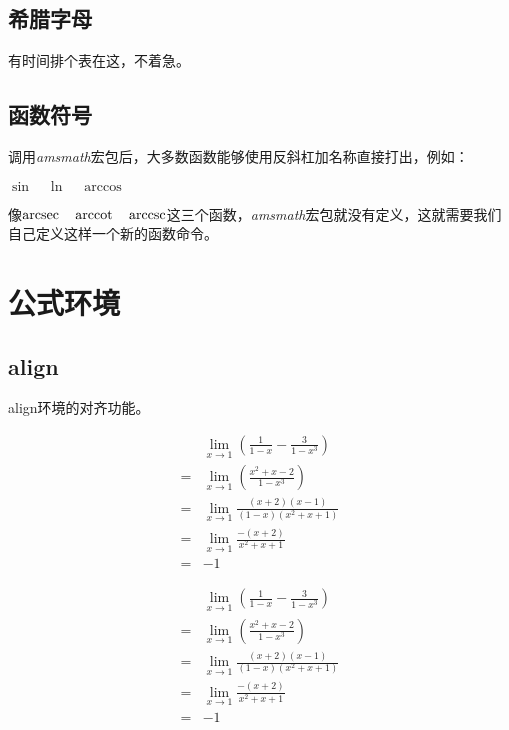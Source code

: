 \subsection{希腊字母}
有时间排个表在这，不着急。

\subsection{函数符号}
调用\emph{amsmath}宏包后，大多数函数能够使用反斜杠加名称直接打出，例如：

\begin{codeshow}
$ \sin \quad \ln \quad \arccos $
\end{codeshow}

像$ \arcsec \quad \arccot \quad \arccsc $这三个函数，\emph{amsmath}宏包就没有定义，这就需要我们自己定义这样一个新的函数命令。
\begin{latex}{}
\DeclareMathOperator{\arcsec}{arcsec}
\DeclareMathOperator{\arccot}{arccot}
\DeclareMathOperator{\arccsc}{arccsc}
\end{latex}

\section{公式环境}

\subsection{align}
align环境的对齐功能。
\begin{latex}{}
\begin{align*}
&\lim\limits_{x\to 1}\left(\frac{1}{1-x}-\frac{3}{1-x^3}\right)\\
= &\lim\limits_{x\to 1}\left(\frac{x^2+x-2}{1-x^3}\right)  \\
=& \lim\limits_{x\to 1}\frac{(x+2)(x-1)}{(1-x)(x^2+x+1)}\\
=& \lim\limits_{x\to 1}\frac{-(x+2)}{x^2+x+1}\\
=& -1
\end{align*}
\end{latex}

\begin{align*}
&\lim\limits_{x\to 1}\left(\frac{1}{1-x}-\frac{3}{1-x^3}\right)\\
= &\lim\limits_{x\to 1}\left(\frac{x^2+x-2}{1-x^3}\right)  \\
=& \lim\limits_{x\to 1}\frac{(x+2)(x-1)}{(1-x)(x^2+x+1)}\\
=& \lim\limits_{x\to 1}\frac{-(x+2)}{x^2+x+1}\\
=& -1
\end{align*}

